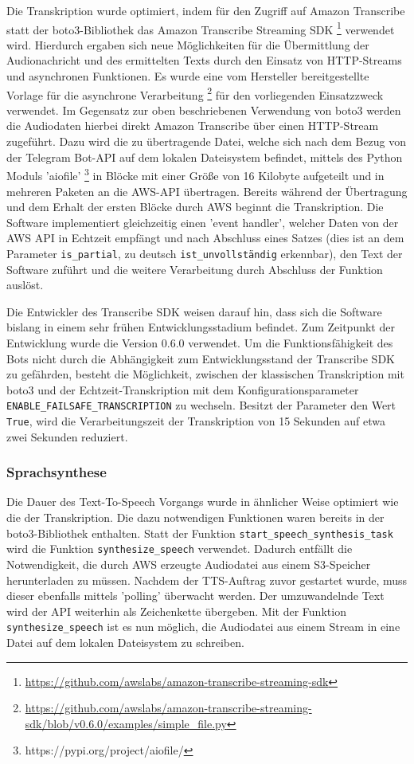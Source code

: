 Die Transkription wurde optimiert, indem für den Zugriff auf Amazon Transcribe statt der boto3-Bibliothek das Amazon Transcribe Streaming SDK \footnote{\url{https://github.com/awslabs/amazon-transcribe-streaming-sdk}} verwendet wird. Hierdurch ergaben sich neue Möglichkeiten für die Übermittlung der Audionachricht und des ermittelten Texts durch den Einsatz von HTTP-Streams und asynchronen Funktionen. Es wurde eine vom Hersteller bereitgestellte Vorlage für die asynchrone Verarbeitung \footnote{\url{https://github.com/awslabs/amazon-transcribe-streaming-sdk/blob/v0.6.0/examples/simple\_file.py}} für den vorliegenden Einsatzzweck verwendet. Im Gegensatz zur oben beschriebenen Verwendung von boto3 werden die Audiodaten hierbei direkt Amazon Transcribe über einen HTTP-Stream zugeführt. Dazu wird die zu übertragende Datei, welche sich nach dem Bezug von der Telegram Bot-API auf dem lokalen Dateisystem befindet, mittels des Python Moduls 'aiofile' \footnote{https://pypi.org/project/aiofile/} in Blöcke mit einer Größe von 16 Kilobyte aufgeteilt und in mehreren Paketen an die AWS-API übertragen. Bereits während der Übertragung und dem Erhalt der ersten Blöcke durch AWS beginnt die Transkription. Die Software implementiert gleichzeitig einen 'event handler', welcher Daten von der AWS API in Echtzeit empfängt und nach Abschluss eines Satzes (dies ist an dem Parameter \lstinline{is_partial}, zu deutsch \lstinline{ist_unvollständig} erkennbar), den Text der Software zuführt und die weitere Verarbeitung durch Abschluss der Funktion auslöst.

Die Entwickler des Transcribe SDK weisen darauf hin, dass sich die Software bislang in einem sehr frühen Entwicklungsstadium befindet. Zum Zeitpunkt der Entwicklung wurde die Version 0.6.0 verwendet. Um die Funktionsfähigkeit des Bots nicht durch die Abhängigkeit zum Entwicklungsstand der Transcribe SDK zu gefährden, besteht die Möglichkeit, zwischen der klassischen Transkription mit boto3 und der Echtzeit-Transkription mit dem Konfigurationsparameter \lstinline{ENABLE_FAILSAFE_TRANSCRIPTION} zu wechseln. Besitzt der Parameter den Wert \lstinline{True}, wird die Verarbeitungszeit der Transkription von 15 Sekunden auf etwa zwei Sekunden reduziert.

\subsubsection{Sprachsynthese}
\label{sec:optimierung-synth}

Die Dauer des Text-To-Speech Vorgangs wurde in ähnlicher Weise optimiert wie die der Transkription. Die dazu notwendigen Funktionen waren bereits in der boto3-Bibliothek enthalten. Statt der Funktion \lstinline{start_speech_synthesis_task} wird die Funktion \lstinline{synthesize_speech} verwendet. Dadurch entfällt die Notwendigkeit, die durch AWS erzeugte Audiodatei aus einem S3-Speicher herunterladen zu müssen. Nachdem der TTS-Auftrag zuvor gestartet wurde, muss dieser ebenfalls mittels 'polling' überwacht werden. Der umzuwandelnde Text wird der API weiterhin als Zeichenkette übergeben. Mit der Funktion \lstinline{synthesize_speech} ist es nun möglich, die Audiodatei aus einem Stream in eine Datei auf dem lokalen Dateisystem zu schreiben. 

